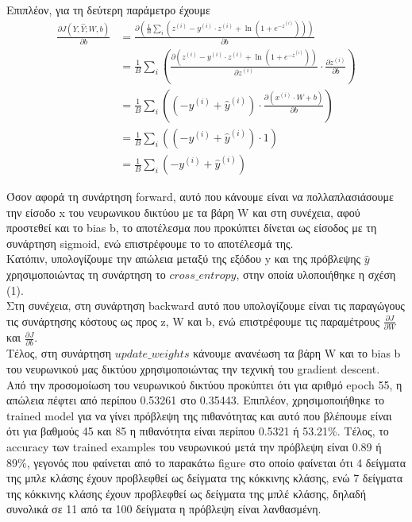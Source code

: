 \documentclass{article}
\begin{document}
	\noindent
	Επιπλέον, για τη δεύτερη παράμετρο έχουμε
	\begin{align*}
			\frac{\partial J(Y,\hat{Y};W,b) }{\partial b}  
					&= \frac{\partial \left( \frac{1}{B} \sum_{i} \left(z^{(i)} - y^{(i)} \cdot z^{(i)} + \ln\left(1 + e^{-z^{(i)}}\right)\right) \right) }{\partial b}\\
					&= \frac{1}{B} \sum_{i} \left(\frac{\partial \left(z^{(i)} - y^{(i)} \cdot z^{(i)} + \ln\left(1 + e^{-z^{(i)}}\right)\right) }{\partial z^{(i)}} \cdot \frac{\partial z^{(i)} }{\partial b}\right) \\
					&= \frac{1}{B} \sum_{i} \left( \left(-y^{(i)} + \hat{y}^{(i)} \right) \cdot \frac{\partial \left( x^{(i)} \cdot W + b \right) }{\partial b}\right) \\
					&= \frac{1}{B} \sum_{i} \left( \left(-y^{(i)} + \hat{y}^{(i)} \right) \cdot 1 \right) \\
					&= \frac{1}{B} \sum_{i} \left (-y^{(i)} + \hat{y}^{(i)} \right)
	\end{align*}

	\noindent
	Όσον αφορά τη συνάρτηση forward, αυτό που κάνουμε είναι να πολλαπλασιάσουμε την είσοδο x του νευρωνικου δικτύου με τα βάρη W και στη συνέχεια, αφού προστεθεί και το bias b, το αποτέλεσμα που προκύπτει δίνεται ως είσοδος με τη συνάρτηση sigmoid, ενώ επιστρέφουμε το το αποτέλεσμά της. \\
	
	\noindent
	Kατόπιν, υπολογίζουμε την απώλεια μεταξύ της εξόδου y και της πρόβλεψης $\hat{y}$ χρησιμοποιώντας τη συνάρτηση το $cross\_entropy$, στην οποία υλοποιήθηκε η σχέση (1).\\
	
	\noindent
	Στη συνέχεια, στη συνάρτηση backward αυτό που υπολογίζουμε είναι τις παραγώγους τις συνάρτησης κόστους ως προς z, W και b, ενώ επιστρέφουμε τις παραμέτρους $ \frac{\partial J }{ \partial W }$ και $ \frac{ \partial J }{ \partial b }$.\\
	
	\noindent
	Τέλος,  στη συνάρτηση $update\_weights$ κάνουμε ανανέωση τα βάρη W και το bias b του νευρωνικού μας δικτύου χρησιμοποιώντας την τεχνική του gradient descent. \\
	
	\noindent
	Από την προσομοίωση του νευρωνικού δικτύου προκύπτει ότι για αριθμό epoch 55, η απώλεια πέφτει από περίπου 0.53261 στο 0.35443. Επιπλέον, χρησιμοποιήθηκε το trained model για να γίνει πρόβλεψη της πιθανότητας και αυτό που βλέπουμε είναι ότι για βαθμούς 45 και 85 η πιθανότητα είναι περίπου 0.5321 ή 53.21\%. Τέλος, το accuracy των trained examples του νευρωνικού μετά την πρόβλεψη είναι 0.89 ή 89\%, γεγονός που φαίνεται από το παρακάτω figure στο οποίο φαίνεται ότι 4 δείγματα της μπλε κλάσης έχουν προβλεφθεί ως δείγματα της κόκκινης κλάσης, ενώ 7 δείγματα της κόκκινης κλάσης έχουν προβλεφθεί ως δείγματα της μπλέ κλάσης, δηλαδή συνολικά σε 11 από τα 100 δείγματα η πρόβλεψη είναι λανθασμένη.
	
\end{document}

